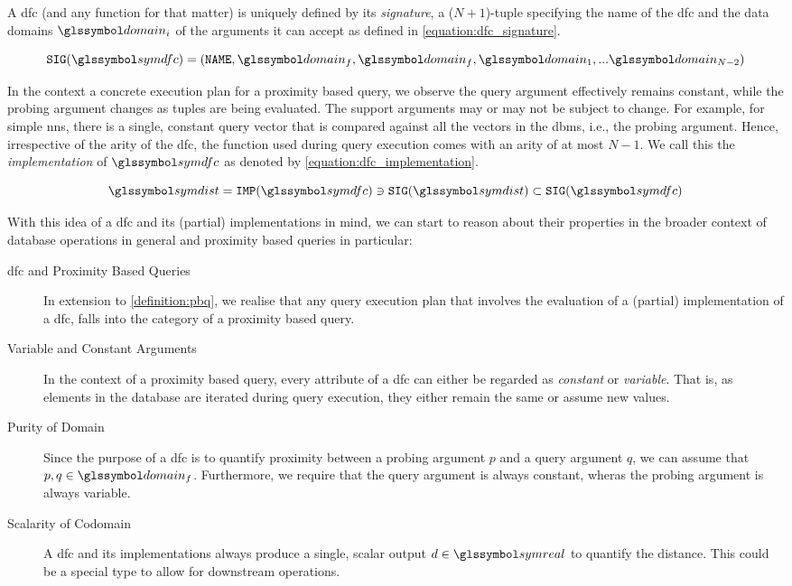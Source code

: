 A \acrshort{dfc} (and any function for that matter) is uniquely defined by its \emph{signature}, a ($N+1$)-tuple specifying the name of the \acrshort{dfc} and the data domains $\domain_i$ of the arguments it can accept as defined in \cref{equation:dfc_signature}.

\begin{equation}
    \label{equation:dfc_signature}
    \texttt{SIG}(\symdfc) = (\mathtt{NAME}, \domain_f, \domain_f, \domain_1,... \domain_{N-2})
\end{equation}

In the context a concrete execution plan for a proximity based query, we observe the query argument effectively remains constant, while the probing argument changes as tuples are being evaluated. The support arguments may or may not be subject to change. For example, for simple \acrshort{nns}, there is a single, constant query vector that is compared against all the vectors in the \acrshort{dbms}, i.e., the probing argument. Hence, irrespective of the arity of the \acrshort{dfc}, the function used during query execution comes with an arity of at most $N-1$. We call this the \emph{implementation} of $\symdfc$ as denoted by \cref{equation:dfc_implementation}.

\begin{equation}
    \label{equation:dfc_implementation}
    \symdist = \texttt{IMP}(\symdfc) \ni \texttt{SIG}(\symdist) \subset \texttt{SIG}(\symdfc)
\end{equation}

With this idea of a \acrshort{dfc} and its (partial) implementations in mind, we can start to reason about their properties in the broader context of database operations in general and proximity based queries in particular:

\begin{description}
    \item[\acrshort{dfc} and Proximity Based Queries] In extension to \cref{definition:pbq}, we realise that any query execution plan that involves the evaluation of a (partial) implementation of a \acrshort{dfc}, falls into the category of a proximity based query.

    \item[Variable and Constant Arguments] In the context of a proximity based query, every attribute of a \acrshort{dfc} can either be regarded as \emph{constant} or \emph{variable}. That is, as elements in the database are iterated during query execution, they either remain the same or assume new values. 
    
    \item[Purity of Domain] Since the purpose of a \acrshort{dfc} is to quantify proximity between a probing argument $p$ and a query argument $q$, we can assume that $p, q \in \domain_f$. Furthermore, we require that the query argument is always constant, wheras the probing argument is always variable.

    \item[Scalarity of Codomain] A \acrshort{dfc} and its implementations always produce a single, scalar output $d \in \symreal$ to quantify the distance. This could be a special type to allow for downstream operations.
\end{description}

